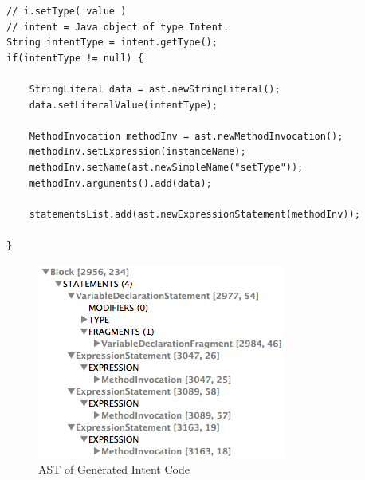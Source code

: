 {\footnotesize\begin{lstlisting}[label=astjavacodesettype,caption=Java code to set type property]
// i.setType( value )
// intent = Java object of type Intent.
String intentType = intent.getType();
if(intentType != null) {

	StringLiteral data = ast.newStringLiteral();
	data.setLiteralValue(intentType);
	
	MethodInvocation methodInv = ast.newMethodInvocation();
	methodInv.setExpression(instanceName);
	methodInv.setName(ast.newSimpleName("setType"));
	methodInv.arguments().add(data);
	
	statementsList.add(ast.newExpressionStatement(methodInv));
	
}		
\end{lstlisting}}

\begin{figure}[t]
  \centering
    \includegraphics[width=.5\textwidth]{ast}
  \caption{AST of Generated Intent Code}
\label{intenttreeview}
\end{figure}
